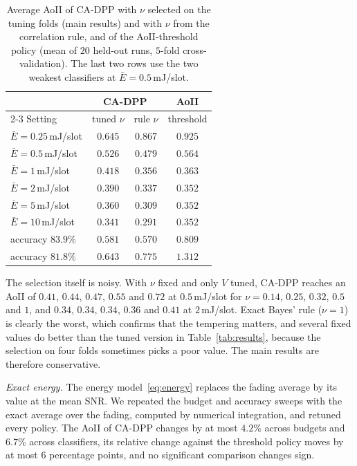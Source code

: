 \documentclass[5p,twocolumn]{elsarticle}
\theoremstyle{remark}
\begin{document}
\begin{table}[t]
\caption{Average AoII of CA-DPP with $\nu$ selected on the tuning folds (main results) and with $\nu$ from the correlation rule, and of the AoII-threshold policy (mean of $20$ held-out runs, $5$-fold cross-validation). The last two rows use the two weakest classifiers at $\bar E=0.5$\,mJ/slot.}\label{tab:nu}
\centering\footnotesize
\begin{tabular}{@{}lccc@{}}
\toprule
 & \multicolumn{2}{c}{CA-DPP} & AoII\\
\cmidrule(lr){2-3}
Setting & tuned $\nu$ & rule $\nu$ & threshold\\
\midrule
$\bar E=0.25$\,mJ/slot & $0.645$ & $0.867$ & $0.925$\\
$\bar E=0.5$\,mJ/slot & $0.526$ & $0.479$ & $0.564$\\
$\bar E=1$\,mJ/slot & $0.418$ & $0.356$ & $0.363$\\
$\bar E=2$\,mJ/slot & $0.390$ & $0.337$ & $0.352$\\
$\bar E=5$\,mJ/slot & $0.360$ & $0.309$ & $0.352$\\
$\bar E=10$\,mJ/slot & $0.341$ & $0.291$ & $0.352$\\
accuracy $83.9\%$ & $0.581$ & $0.570$ & $0.809$\\
accuracy $81.8\%$ & $0.643$ & $0.775$ & $1.312$\\
\bottomrule
\end{tabular}
\end{table}

The selection itself is noisy. With $\nu$ fixed and only $V$ tuned, CA-DPP reaches an AoII of $0.41$, $0.44$, $0.47$, $0.55$ and $0.72$ at $0.5$\,mJ/slot for $\nu=0.14$, $0.25$, $0.32$, $0.5$ and $1$, and $0.34$, $0.34$, $0.34$, $0.36$ and $0.41$ at $2$\,mJ/slot. Exact Bayes' rule ($\nu=1$) is clearly the worst, which confirms that the tempering matters, and several fixed values do better than the tuned version in Table~\ref{tab:results}, because the selection on four folds sometimes picks a poor value. The main results are therefore conservative.

\emph{Exact energy.} The energy model~\eqref{eq:energy} replaces the fading average by its value at the mean SNR. We repeated the budget and accuracy sweeps with the exact average over the fading, computed by numerical integration, and retuned every policy. The AoII of CA-DPP changes by at most $4.2\%$ across budgets and $6.7\%$ across classifiers, its relative change against the threshold policy moves by at most $6$ percentage points, and no significant comparison changes sign.
\end{document}
